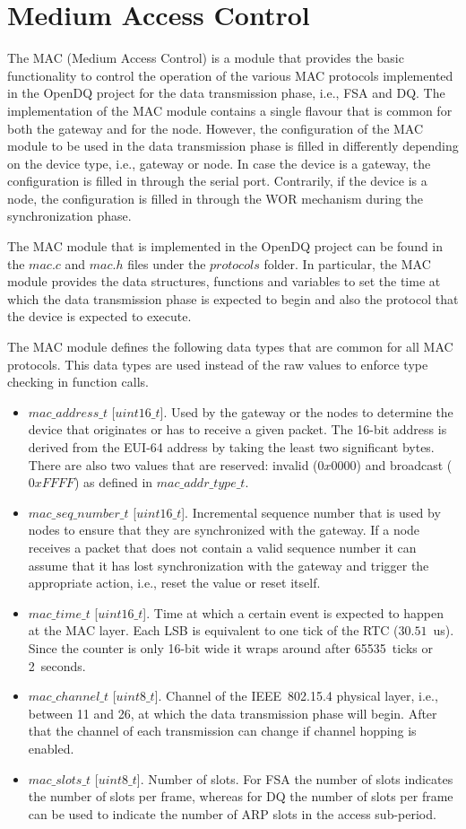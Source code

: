 \section{Medium Access Control}
\label{sec:06-mac}
The MAC (Medium Access Control) is a module that provides the basic functionality to control the operation of the various MAC protocols implemented in the OpenDQ project for the data transmission phase, i.e., FSA and DQ. The implementation of the MAC module contains a single flavour that is common for both the gateway and for the node. However, the configuration of the MAC module to be used in the data transmission phase is filled in differently depending on the device type, i.e., gateway or node. In case the device is a gateway, the configuration is filled in through the serial port. Contrarily, if the device is a node, the configuration is filled in through the WOR mechanism during the synchronization phase.

The MAC module that is implemented in the OpenDQ project can be found in the $mac.c$ and $mac.h$ files under the $protocols$ folder. In particular, the MAC module provides the data structures, functions and variables to set the time at which the data transmission phase is expected to begin and also the protocol that the device is expected to execute. 

The MAC module defines the following data types that are common for all MAC protocols. This data types are used instead of the raw values to enforce type checking in function calls.
\begin{itemize}
\item $mac\_address\_t$ [$uint16\_t$]. Used by the gateway or the nodes to determine the device that originates or has to receive a given packet. The 16-bit address is derived from the EUI-64 address by taking the least two significant bytes. There are also two values that are reserved: invalid ($0x0000$) and broadcast ($0xFFFF$) as defined in $mac\_addr\_type\_t$.
\item $mac\_seq\_number\_t$ [$uint16\_t$]. Incremental sequence number that is used by nodes to ensure that they are synchronized with the gateway. If a node receives a packet that does not contain a valid sequence number it can assume that it has lost synchronization with the gateway and trigger the appropriate action, i.e., reset the value or reset itself.
\item $mac\_time\_t$ [$uint16\_t$]. Time at which a certain event is expected to happen at the MAC layer. Each LSB is equivalent to one tick of the RTC ($30.51$~us). Since the counter is only 16-bit wide it wraps around after 65535~ticks or 2~seconds.
\item $mac\_channel\_t$ [$uint8\_t$]. Channel of the IEEE~802.15.4 physical layer, i.e., between 11 and 26, at which the data transmission phase will begin. After that the channel of each transmission can change if channel hopping is enabled.
\item $mac\_slots\_t$ [$uint8\_t$]. Number of slots. For FSA the number of slots indicates the number of slots per frame, whereas for DQ the number of slots per frame can be used to indicate the number of ARP slots in the access sub-period.
\end{itemize}

